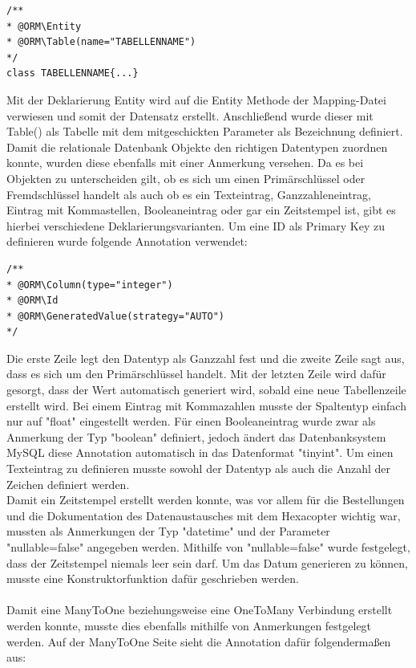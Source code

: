 	\lstset{language=php}
  	\begin{lstlisting}
/**
* @ORM\Entity
* @ORM\Table(name="TABELLENNAME")
*/
class TABELLENNAME{...}
  	\end{lstlisting}
Mit der Deklarierung Entity wird auf die Entity Methode der Mapping-Datei verwiesen und somit der Datensatz erstellt. Anschließend wurde dieser mit Table() als Tabelle mit dem mitgeschickten Parameter als Bezeichnung definiert. 
Damit die relationale Datenbank Objekte den richtigen Datentypen zuordnen konnte, wurden diese ebenfalls mit einer Anmerkung versehen. Da es bei Objekten zu unterscheiden gilt, ob es sich um einen Primärschlüssel oder Fremdschlüssel handelt als auch ob es ein Texteintrag, Ganzzahleneintrag, Eintrag mit Kommastellen, Booleaneintrag oder gar ein Zeitstempel ist, gibt es hierbei verschiedene Deklarierungsvarianten.
Um eine ID als Primary Key zu definieren wurde folgende Annotation verwendet:	
	\lstset{language=php}
  	\begin{lstlisting}
/**
* @ORM\Column(type="integer")
* @ORM\Id
* @ORM\GeneratedValue(strategy="AUTO")
*/
  	\end{lstlisting}
Die erste Zeile legt den Datentyp als Ganzzahl fest und die zweite Zeile sagt aus, dass es sich um den Primärschlüssel handelt. Mit der letzten Zeile wird dafür gesorgt, dass der Wert automatisch generiert wird, sobald eine neue Tabellenzeile erstellt wird.
Bei einem Eintrag mit Kommazahlen musste der Spaltentyp einfach nur auf "float" eingestellt werden. Für einen Booleaneintrag wurde zwar als Anmerkung der Typ "boolean" definiert, jedoch ändert das Datenbanksystem MySQL diese Annotation automatisch in das Datenformat "tinyint".
Um einen Texteintrag zu definieren musste sowohl der Datentyp als auch die Anzahl der Zeichen definiert werden.\\
Damit ein Zeitstempel erstellt werden konnte, was vor allem für die Bestellungen und die Dokumentation des Datenaustausches mit dem Hexacopter wichtig war, mussten als Anmerkungen der Typ "datetime" und der Parameter "nullable=false" angegeben werden.
Mithilfe von "nullable=false" wurde festgelegt, dass der Zeitstempel niemals leer sein darf.
Um das Datum generieren zu können, musste eine Konstruktorfunktion dafür geschrieben werden.\\ \\
Damit eine ManyToOne beziehungsweise eine OneToMany Verbindung erstellt werden konnte, musste dies ebenfalls mithilfe von Anmerkungen festgelegt werden.
Auf der ManyToOne Seite sieht die Annotation dafür folgendermaßen aus:
	
